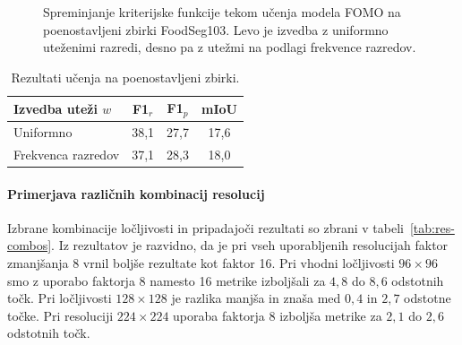 \documentclass[a4paper,twoside,openright,12pt,slovene]{book}
\begin{document}
\begin{figure}[hbt]
\begin{tabular}{@{}cc@{}}
                \end{tabular}
                \caption[Kriterijska funkcija pri učenju FOMO na poenostavljeni zbirki]{Spreminjanje kriterijske funkcije tekom učenja modela FOMO na poenostavljeni zbirki FoodSeg103. Levo je izvedba z uniformno uteženimi razredi, desno pa z utežmi na podlagi frekvence razredov.}
                \label{fig:experiment_simplified_foodseg103_dataset_loss}
            \end{figure}

            \begin{table}[hbt]
                \centering
                \begin{tabular}{lccc}
                    \toprule
                    \textbf{Izvedba uteži $w$} & \textbf{F1$_r$} & \textbf{F1$_p$} & \textbf{mIoU} \\
                    \midrule
                    Uniformno          & 38{,}1 & 27{,}7  & 17{,}6  \\
                    Frekvenca razredov & 37{,}1 & 28{,}3  & 18{,}0  \\
                    \bottomrule
                \end{tabular}
                \caption{Rezultati učenja na poenostavljeni zbirki.}
                \label{tab:experiment_simplified_foodseg103_dataset_table}
            \end{table}

        
            \FloatBarrier

            \paragraph{Primerjava različnih kombinacij resolucij}

            Izbrane kombinacije ločljivosti in pripadajoči rezultati so zbrani
            v tabeli~\ref{tab:res-combos}. 
            Iz rezultatov je razvidno, da je pri vseh uporabljenih resolucijah
            faktor zmanjšanja 8 vrnil boljše rezultate kot faktor 16. Pri
            vhodni ločljivosti $96 \times 96$ smo z uporabo faktorja 8 namesto
            16 metrike izboljšali za $4{,}8$ do $8{,}6$ odstotnih točk. Pri
            ločljivosti $128 \times 128$ je razlika manjša in znaša med $0{,}4$
            in $2{,}7$ odstotne točke. Pri resoluciji $224 \times 224$ uporaba
            faktorja 8 izboljša metrike za $2{,}1$ do $2{,}6$ odstotnih točk.
\end{document}
